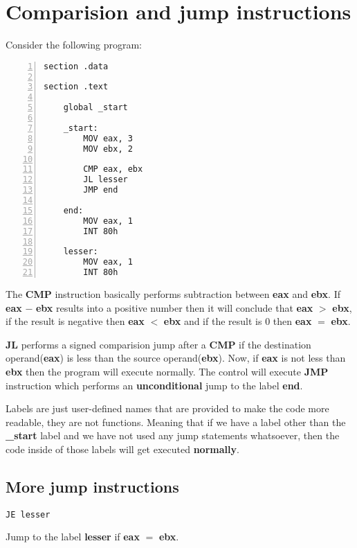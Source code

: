\documentclass{article}
\makeatletter
\renewcommand\paragraph{\@startsection{paragraph}{4}{\z@}{-3.25ex \@plus -1ex \@minus -.2ex}{1.5ex \@plus .2ex}{\normalfont\normalsize\bfseries}}
\makeatother
\begin{document}
\section{Comparision and jump instructions}\label{sec:sec1}
\paragraph{}
Consider the following program:
\begin{Verbatim}[numbers=left, frame=single]
section .data

section .text

	global _start
	
	_start:
		MOV eax, 3
		MOV ebx, 2
	
		CMP eax, ebx
		JL lesser
		JMP end
		
	end:
		MOV eax, 1
		INT 80h
		
	lesser:
		MOV eax, 1
		INT 80h
\end{Verbatim}
The \textbf{CMP} instruction basically performs subtraction between \textbf{eax} and \textbf{ebx}. If \textbf{eax} $-$ \textbf{ebx} results into a positive number then it will conclude that \textbf{eax} $>$ \textbf{ebx}, if the result is negative then \textbf{eax} $<$ \textbf{ebx} and if the result is $0$ then \textbf{eax} $=$ \textbf{ebx}.

\vspace{10pt}
\textbf{JL} performs a signed comparision jump after a \textbf{CMP} if the destination operand(\textbf{eax}) is less than the source operand(\textbf{ebx}). Now, if \textbf{eax} is not less than \textbf{ebx} then the program will execute normally. The control will execute \textbf{JMP} instruction which performs an \textbf{unconditional} jump to the label \textbf{end}.

\vspace{10pt}
Labels are just user-defined names that are provided to make the code more readable, they are not functions. Meaning that if we have a label other than the \textbf{\_start} label and we have not used any jump statements whatsoever, then the code inside of those labels will get executed \textbf{normally}.
\newpage
\subsection{More jump instructions}\label{sec:subsec1}
\paragraph{}
\begin{Verbatim}[frame=single]
JE lesser
\end{Verbatim}
Jump to the label \textbf{lesser} if \textbf{eax} $=$ \textbf{ebx}.
\end{document}
